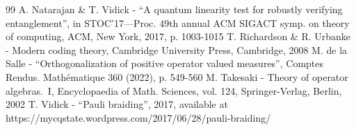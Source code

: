 \documentclass[10pt]{amsart}
\theoremstyle{plain}
\theoremstyle{definition}
\begin{document}
\begin{thebibliography}{99}
 A. Natarajan \& T. Vidick - “A quantum linearity test for robustly verifying entanglement”, in STOC’17—Proc. 49th annual ACM SIGACT symp. on theory of computing, ACM, New York, 2017, p. 1003-1015
 T. Richardson \& R. Urbanke - Modern coding theory, Cambridge University Press, Cambridge, 2008
 M. de la Salle - “Orthogonalization of positive operator valued measures”, Comptes Rendus. Mathématique 360 (2022), p. 549-560
 M. Takesaki - Theory of operator algebras. I, Encyclopaedia of Math. Sciences, vol. 124, Springer-Verlag, Berlin, 2002
 T. Vidick - “Pauli braiding”, 2017, available at https://mycqstate.wordpress.com/2017/06/28/pauli-braiding/
\end{thebibliography}
\end{document}
